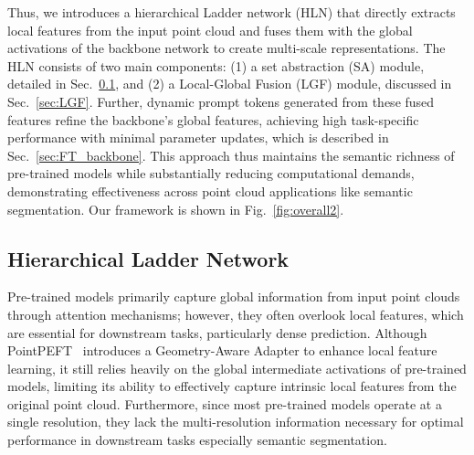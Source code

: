 



Thus, we introduces a hierarchical Ladder network (HLN) that directly extracts local features from the input point cloud and fuses them with the global activations of the backbone network to create multi-scale representations. The HLN consists of two main components: (1) a set abstraction (SA) module, detailed in Sec.~\ref{sec:HLN}, and (2) a Local-Global Fusion (LGF) module, discussed in Sec.~\ref{sec:LGF}. 
Further, dynamic prompt tokens generated from these fused features refine the backbone’s global features, achieving high task-specific performance with minimal parameter updates, which is described in Sec.~\ref{sec:FT_backbone}. This approach thus maintains the semantic richness of pre-trained models while substantially reducing computational demands, demonstrating effectiveness across point cloud applications like semantic segmentation.
Our framework is shown in Fig.~\ref{fig:overall2}.

\subsection{Hierarchical Ladder Network}
\label{sec:HLN}
Pre-trained models primarily capture global information from input point clouds through attention mechanisms; however, they often overlook local features, which are essential for downstream tasks, particularly dense prediction. Although PointPEFT~\cite{tang2024point} introduces a Geometry-Aware Adapter to enhance local feature learning, it still relies heavily on the global intermediate activations of pre-trained models, limiting its ability to effectively capture intrinsic local features from the original point cloud. Furthermore, since most pre-trained models operate at a single resolution, they lack the multi-resolution information necessary for optimal performance in downstream tasks especially semantic segmentation.

